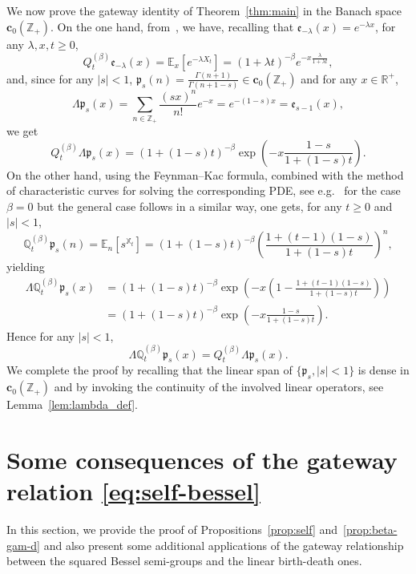 \documentclass[10pt]{amsart}
\theoremstyle{definition}\newtheorem{defi}[theo]{Definition}\newtheorem{rema}[theo]{Remark}\newtheorem{exam}[theo]{Example}\newtheorem{exem}[theo]{Example}\newtheorem{nota}[theo]{Notation}
\newcommand{\ZZ}{\mathbb{Z}}
\newcommand{\fe}{\mathfrak{e}}
\newcommand{\esc}{\mathbf{c}}
\newcommand*\E{{\mathbb E}}
\newcommand*\R{{\mathbb R}}
\newcommand{\discret}[1]{\mathds{#1}}
\newcommand{\cont}[1]{{#1}}
\begin{document}
We now prove the gateway identity of Theorem~\ref{thm:main} in the Banach space $\esc_0(\ZZ_+)$. On the one hand, from~\cite[Chapter~XI]{MR1725357}, we have, recalling that $\fe_{-\lambda}(x)=e^{-\lambda x}$, for any $\lambda,x, t\geq 0$,
\begin{equation*}\label{eq:lt_bessel}
\cont{Q}^{(\beta)}_t \fe_{-\lambda}(x)=\E_x\left[e^{-\lambda \cont{X}_t}\right]= (1+\lambda t)^{-\beta}e^{-x\frac{\lambda}{1+\lambda t}},
\end{equation*}
and, since for any $|s|<1$, $\mathfrak{p}_s(n)=\frac{\Gamma(n+1)}{\Gamma(n+1-s)}\in \esc_0(\ZZ_+)$ and for any $x\in \R^+$,
\[
\Lambda \mathfrak{p}_s(x) =\sum_{n\in\ZZ_+}\frac{(sx)^n}{n!}e^{-x}=e^{-(1-s)x}=\fe_{s-1}(x),
\]
we get
\begin{equation*}
\cont{Q}^{(\beta)}_t \Lambda\mathfrak{p}_s(x)=\left(1+(1-s)t\right)^{-\beta}
\exp\left(-x\frac{1-s}{1+(1-s)t}\right).
\end{equation*}
On the other hand, using the Feynman--Kac formula, combined with the method of characteristic curves for solving the corresponding PDE, see e.g.~\cite[Chapter~4]{Dawson} for the case $\beta=0$ but the general case follows in a similar way, one gets, for any $t\geq 0$ and $|s|<1$,
\begin{equation*}
\discret{Q}^{(\beta)}_t \mathfrak{p}_s(n)=\E_n\left[s^{\discret{X}_t}\right]=\left(1+(1-s)t\right)^{-\beta}
\left(\frac{1+(t-1)(1-s)}{1+(1-s)t}\right)^{n},
\end{equation*}
yielding
\begin{align*}
\Lambda \discret{Q}^{(\beta)}_t \mathfrak{p}_s(x)&=\left(1+(1-s)t\right)^{-\beta}
\exp\left(-x\left(1-\frac{1+(t-1)(1-s)}{1+(1-s)t}\right)\right) \\
&=\left(1+(1-s)t\right)^{-\beta}
\exp\left(-x\frac{1-s}{1+(1-s)t}\right).
\end{align*}
Hence for any $|s|<1$,
\[
\Lambda \discret{Q}^{(\beta)}_t \mathfrak{p}_s(x)=\cont{Q}^{(\beta)}_t \Lambda\mathfrak{p}_s(x).
\]
We complete the proof by recalling that the linear span of $\{\mathfrak{p}_s,|s|<1\}$ is dense in $\esc_0(\ZZ_+)$ and by invoking the continuity of the involved linear operators, see Lemma~\ref{lem:lambda_def}.



\section{Some consequences of the gateway relation \texorpdfstring{\eqref{eq:self-bessel}}{}}\label{sec:cons-bes}
In this section, we provide the proof of Propositions~\ref{prop:self} and~\ref{prop:beta-gam-d} and also present some additional applications of the gateway relationship between the squared Bessel semi-groups and the linear birth-death ones.
\end{document}
